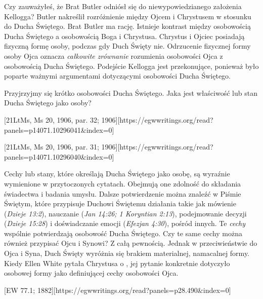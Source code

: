 Czy zauważyłeś, że Brat Butler odniósł się do niewypowiedzianego założenia Kellogga? Butler nakreślił rozróżnienie między Ojcem i Chrystusem w stosunku do Ducha Świętego. Brat Butler ma rację. Istnieje kontrast między osobowością Ducha Świętego a osobowością Boga i Chrystusa. Chrystus i Ojciec posiadają fizyczną formę osoby, podczas gdy Duch Święty nie. Odrzucenie fizycznej formy osoby Ojca oznacza \textit{całkowite zrównanie} rozumienia osobowości Ojca z osobowością Ducha Świętego. Podejście Kellogga jest przekonujące, ponieważ było poparte ważnymi argumentami dotyczącymi osobowości Ducha Świętego.

Przyjrzyjmy się krótko osobowości Ducha Świętego. Jaka jest właściwość lub stan Ducha Świętego jako osoby?

[21LtMs, Ms 20, 1906, par. 32; 1906][https://egwwritings.org/read?panels=p14071.10296041&index=0]

[21LtMs, Ms 20, 1906, par. 31; 1906][https://egwwritings.org/read?panels=p14071.10296040&index=0]

Cechy lub stany, które określają Ducha Świętego jako osobę, są wyraźnie wymienione w przytoczonych cytatach. Obejmują one zdolność do składania świadectwa i badania umysłu. Dalsze potwierdzenie można znaleźć w Piśmie Świętym, które przypisuje Duchowi Świętemu działania takie jak mówienie (\textit{Dzieje 13:2}), nauczanie (\textit{Jan 14:26; 1 Koryntian 2:13}), podejmowanie decyzji (\textit{Dzieje 15:28}) i doświadczanie emocji (\textit{Efezjan 4:30}), pośród innych. Te \textit{cechy} wspólnie potwierdzają osobowość Ducha Świętego. Czy te same cechy można również przypisać Ojcu i Synowi? Z całą pewnością. Jednak w przeciwieństwie do Ojca i Syna, Duch Święty wyróżnia się brakiem materialnej, namacalnej formy. Kiedy Ellen White pytała Chrystusa o , jej pytanie konkretnie dotyczyło osobowej formy jako definiującej cechy osobowości Ojca.

[EW 77.1; 1882][https://egwwritings.org/read?panels=p28.490&index=0]

